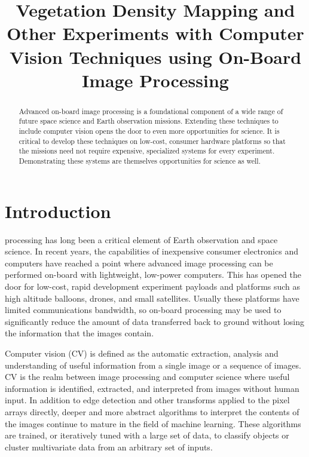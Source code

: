 \documentclass[conference]{IEEEtran} %
\title{Vegetation Density Mapping and Other Experiments with Computer Vision Techniques using On-Board Image Processing}
\author{
   \IEEEauthorblockN{%
    Jeff~Maggio\IEEEauthorrefmark{1},
    Philip~Linden\IEEEauthorrefmark{2},
    T.J.~Tarazevits\IEEEauthorrefmark{3}
  }
  \IEEEauthorblockA{%
    RIT Space Exploration, Rochester Institute of Technology \\ %
    Rochester, N.Y. \\
    Email:
    \IEEEauthorrefmark{1}jxm9264.rit.edu,
    \IEEEauthorrefmark{2}pjl7651@rit.edu,
    \IEEEauthorrefmark{3}tjt3085@rit.edu
  }
}
\begin{document}
\maketitle%

\begin{abstract}
    Advanced on-board image processing is a foundational component of a wide range of future space science and Earth observation missions.
    Extending these techniques to include computer vision opens the door to even more opportunities for science.
    It is critical to develop these techniques on low-cost, consumer hardware platforms so that the missions need not require expensive, specialized systems for every experiment.
    Demonstrating these systems are themselves opportunities for science as well.
\end{abstract}

\section{Introduction}
\label{sec:introduction}

 processing has long been a critical element of Earth observation and space science.
In recent years, the capabilities of inexpensive consumer electronics and computers have reached a point where advanced image processing can be performed on-board with lightweight, low-power computers.
This has opened the door for low-cost, rapid development experiment payloads and platforms such as high altitude balloons, drones, and small satellites.
Usually these platforms have limited communications bandwidth, so on-board processing may be used to significantly reduce the amount of data transferred back to ground without losing the information that the images contain.

Computer vision (CV) is defined as the automatic extraction, analysis and understanding of useful information from a single image or a sequence of images.
CV is the realm between image processing and computer science where useful information is identified, extracted, and interpreted from images without human input.
In addition to edge detection and other transforms applied to the pixel arrays directly, deeper and more abstract algorithms to interpret the contents of the images continue to mature in the field of machine learning.
These algorithms are trained, or iteratively tuned with a large set of data, to classify objects or cluster multivariate data from an arbitrary set of inputs.
\end{document}
